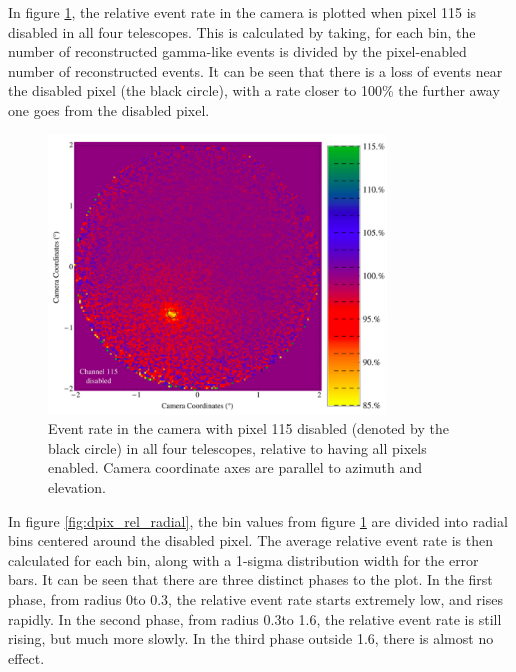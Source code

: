 In figure \ref{fig:dpix_rel_camera}, the relative event rate in the camera is plotted when pixel 115 is disabled in all four telescopes.
This is calculated by taking, for each bin, the number of reconstructed gamma-like events is divided by the pixel-enabled number of reconstructed events.
It can be seen that there is a loss of events near the disabled pixel (the black circle), with a rate closer to 100\% the further away one goes from the disabled pixel.

\begin{figure}[ht]
  \begin{center}
    \includegraphics[width=0.8\textwidth]{images/disabled_pixel/relativerate_camera}
    \caption[Relative Event Rate]{Event rate in the camera with pixel 115 disabled (denoted by the black circle) in all four telescopes, relative to having all pixels enabled.  Camera coordinate axes are parallel to azimuth and elevation.}\label{fig:dpix_rel_camera}
  \end{center}
\end{figure}

In figure \ref{fig:dpix_rel_radial}, the bin values from figure \ref{fig:dpix_rel_camera} are divided into radial bins centered around the disabled pixel.
The average relative event rate is then calculated for each bin, along with a 1-sigma distribution width for the error bars.
It can be seen that there are three distinct phases to the plot.
In the first phase, from radius 0\degree to 0.3\degree, the relative event rate starts extremely low, and rises rapidly.
In the second phase, from radius 0.3\degree to 1.6\degree, the relative event rate is still rising, but much more slowly.
In the third phase outside 1.6\degree, there is almost no effect.


